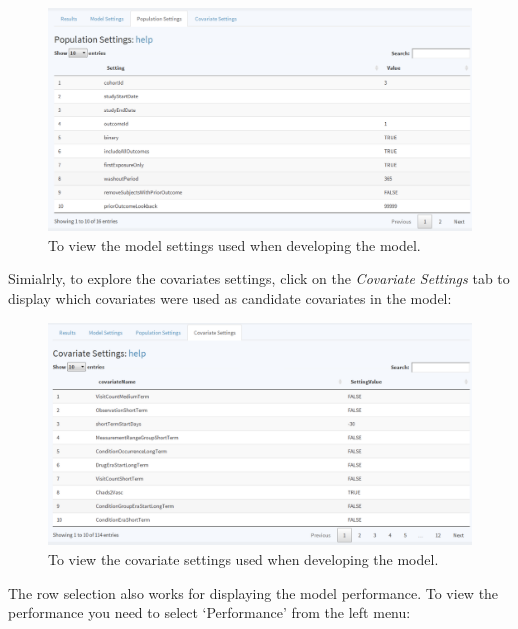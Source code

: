 \documentclass[11pt]{book}
\theoremstyle{definition}
\theoremstyle{definition}
\theoremstyle{definition}
\theoremstyle{remark}
\begin{document}
\begin{figure}

{\centering \includegraphics[width=0.8\linewidth]{images/PatientLevelPrediction/shiny/shinyPopSet} 

}

\caption{To view the model settings used when developing the model.}\label{fig:shinyPopSet}
\end{figure}

Simialrly, to explore the covariates settings, click on the \emph{Covariate Settings} tab to display which covariates were used as candidate covariates in the model:

\begin{figure}

{\centering \includegraphics[width=0.8\linewidth]{images/PatientLevelPrediction/shiny/shinyCovSet} 

}

\caption{To view the covariate settings used when developing the model.}\label{fig:shinyCovSet}
\end{figure}

The row selection also works for displaying the model performance. To view the performance you need to select `Performance' from the left menu:
\end{document}
